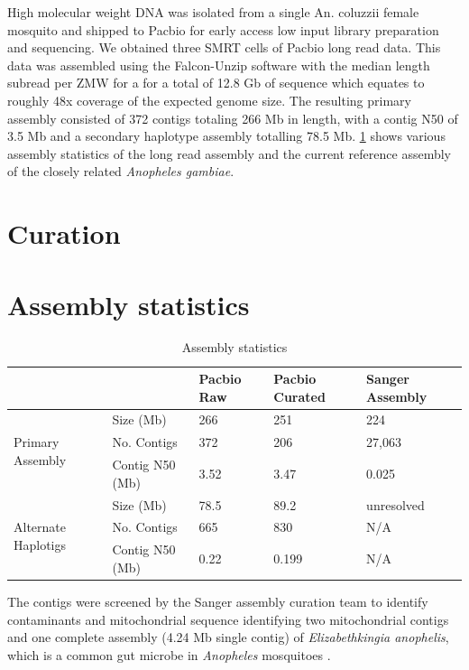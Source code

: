 High molecular weight DNA was isolated from a single An. coluzzii female mosquito and shipped to Pacbio for early access low input 
library preparation and sequencing. We obtained three SMRT cells of Pacbio long read data. This data was assembled using the Falcon-Unzip 
software with the median length subread per ZMW for a for a total of 12.8 Gb of sequence which equates to roughly 48x coverage of the expected 
genome size. The resulting primary assembly consisted of 372 contigs totaling 266 Mb in length, with a contig N50 of 3.5 Mb and a secondary 
haplotype assembly totalling 78.5 Mb. \ref{table:assemblydata} shows various assembly statistics of the long read assembly and the current 
reference assembly of the closely related \textit{Anopheles gambiae}\cite{PEST}\cite{PESTupdate}\cite{PESTchromitin}\cite{gambiaeref}. 

\section{Curation}

\section{Assembly statistics}



\begin{table}[h!]
\caption{Assembly statistics}
\label{table:assemblydata}
\begin{center}
\begin{tabular}{ | l | l | l | l | l |}
\hline
\multicolumn{2}{|c|}{} & Pacbio Raw & Pacbio Curated & Sanger Assembly \\
\hline

\multirow{3}{4em}{Primary Assembly}
& Size (Mb) & 266 & 251 & 224 \\
\cline{2-5}
& No. Contigs & 372 & 206 & 27,063 \\
\cline{2-5}
& Contig N50 (Mb) & 3.52	& 3.47	& 0.025 \\
\hline%
\multirow{3}{4em}{Alternate Haplotigs}
& Size (Mb) & 78.5 & 	89.2	& unresolved \\
\cline{2-5}
& No. Contigs & 665 &	830& 	N/A \\
\cline{2-5}
& Contig N50 (Mb) & 0.22	& 0.199	& N/A \\
\hline
\end{tabular}
\end{center}
\end{table}
The contigs were screened by the Sanger assembly curation team to identify contaminants and mitochondrial sequence identifying two mitochondrial contigs and one 
complete assembly (4.24 Mb single contig) of \textit{Elizabethkingia anophelis}, which is a common gut microbe in \textit{Anopheles} mosquitoes \cite{kingia}. 

